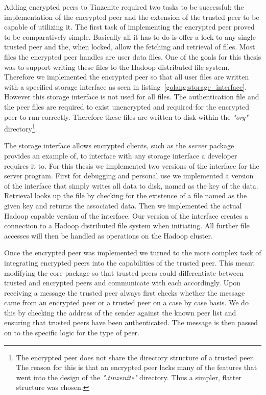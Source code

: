 Adding encrypted peers to Tinzenite required two tasks to be successful: the implementation of the encrypted peer and the extension of the trusted peer to be capable of utilizing it.
The first task of implementing the encrypted peer proved to be comparatively simple.
Basically all it has to do is offer a lock to any single trusted peer and the, when locked, allow the fetching and retrieval of files.
Most files the encrypted peer handles are user data files.
One of the goals for this thesis was to support writing these files to the Hadoop distributed file system.
Therefore we implemented the encrypted peer so that all user files are written with a specified storage interface as seen in listing~\ref{golang:storage_interface}.
However this storage interface is not used for all files.
The authentication file and the peer files are required to exist unencrypted and required for the encrypted peer to run correctly.
Therefore these files are written to disk within the \textit{"org"} directory\footnote{The encrypted peer does not share the directory structure of a trusted peer. The reason for this is that an encrypted peer lacks many of the features that went into the design of the \textit{".tinzenite"} directory. Thus a simpler, flatter structure was chosen.}.

The storage interface allows encrypted clients, such as the \emph{server} package provides an example of, to interface with any storage interface a developer requires it to.
For this thesis we implemented two versions of the interface for the server program.
First for debugging and personal use we implemented a version of the interface that simply writes all data to disk, named as the key of the data.
Retrieval looks up the file by checking for the existence of a file named as the given key and returns the associated data.
Then we implemented the actual Hadoop capable version of the interface.
Our version of the interface creates a connection to a Hadoop distributed file system when initiating.
All further file accesses will then be handled as operations on the Hadoop cluster.

Once the encrypted peer was implemented we turned to the more complex task of integrating encrypted peers into the capabilities of the trusted peer.
This meant modifying the core package so that trusted peers could differentiate between trusted and encrypted peers and communicate with each accordingly.
Upon receiving a message the trusted peer always first checks whether the message came from an encrypted peer or a trusted peer on a case by case basis.
We do this by checking the address of the sender against the known peer list and ensuring that trusted peers have been authenticated.
The message is then passed on to the specific logic for the type of peer.

